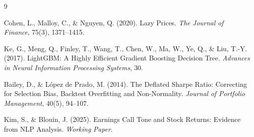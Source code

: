 \documentclass[11pt,a4paper]{article}
\begin{document}

\begin{thebibliography}{9}

Cohen, L., Malloy, C., \& Nguyen, Q. (2020).
\newblock Lazy Prices.
\newblock \emph{The Journal of Finance}, 75(3), 1371--1415.

Ke, G., Meng, Q., Finley, T., Wang, T., Chen, W., Ma, W., Ye, Q., \& Liu, T.-Y. (2017).
\newblock LightGBM: A Highly Efficient Gradient Boosting Decision Tree.
\newblock \emph{Advances in Neural Information Processing Systems}, 30.

Bailey, D., \& L\'opez de Prado, M. (2014).
\newblock The Deflated Sharpe Ratio: Correcting for Selection Bias, Backtest Overfitting and Non-Normality.
\newblock \emph{Journal of Portfolio Management}, 40(5), 94--107.

Kim, S., \& Blouin, J. (2025).
\newblock Earnings Call Tone and Stock Returns: Evidence from NLP Analysis.
\newblock \emph{Working Paper}.

\end{thebibliography}
\end{document}
